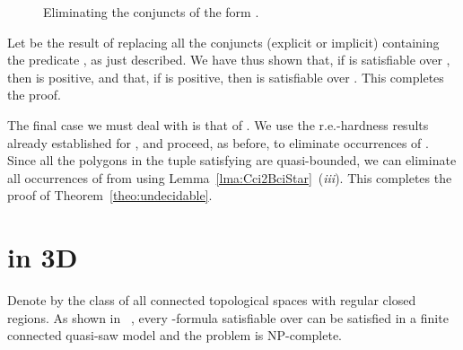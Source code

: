 \documentclass{article}
\newcommand{\NP}{\textsc{NP}}
\begin{document}
\begin{figure}[h]
\begin{center}
{	
	}
	\end{center}
	\caption{Eliminating the conjuncts of the form .} 
	\label{fig:crenellate}
\end{figure}
Let  be the result of replacing all the conjuncts (explicit
or implicit) containing the predicate , as just described. We have
thus shown that, if  is satisfiable over , then
 is positive, and that, if  is positive, then  is
satisfiable over . This completes the proof.

The final case we must deal with is that of . We use the
r.e.-hardness results already established for , and proceed,
as before, to eliminate occurrences of . Since all the polygons in 
the tuple satisfying  are quasi-bounded, we can eliminate 
all occurrences of  from  using 
Lemma~\ref{lma:Cci2BciStar}~(\emph{iii}). This completes the proof of 
Theorem~\ref{theo:undecidable}.




\section{ in 3D}\label{sec:Bci3D_C}

\newcommand{\ConRC}{{\sf ConRC}}


Denote by  the class of all connected topological spaces with regular closed regions. As shown in ~\cite{ijcai:kphz10}, every -formula satisfiable over  can be satisfied in a finite connected quasi-saw model and the problem  is \NP-complete.
\end{document}
